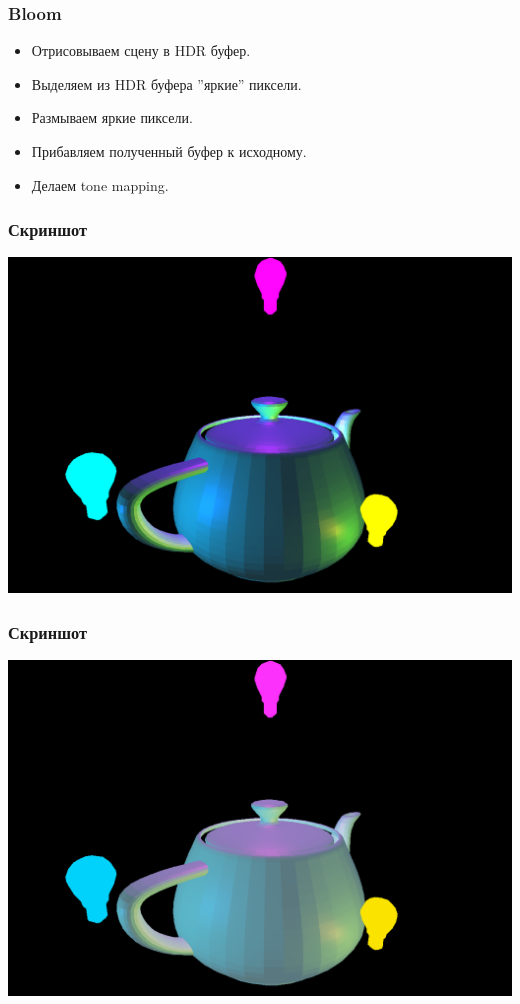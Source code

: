 \documentclass{beamer}
\begin{document}
\begin{frame}
	\frametitle{Bloom}
	
	\begin{itemize}
		\item<1-> Отрисовываем сцену в HDR буфер.
		\item<1-> Выделяем из HDR буфера ''яркие'' пиксели.
		\item<1-> Размываем яркие пиксели.
		\item<1-> Прибавляем полученный буфер к исходному.
		\item<1-> Делаем tone mapping.
	\end{itemize}
\end{frame}

\begin{frame}
	\frametitle{Скриншот}
	\begin{center}
		\includegraphics[scale=0.28]{scene.png} 
	\end{center}
\end{frame}

\begin{frame}
	\frametitle{Скриншот}
	\begin{center}
		\includegraphics[scale=0.28]{scene2.png} 
	\end{center}
\end{frame}
\end{document}
